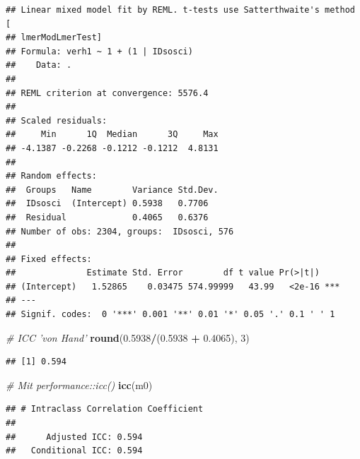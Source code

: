 \documentclass[
]{book}
\newenvironment{Shaded}{\begin{snugshade}}{\end{snugshade}}
\newcommand{\CommentTok}[1]{\textcolor[rgb]{0.56,0.35,0.01}{\textit{#1}}}
\newcommand{\DataTypeTok}[1]{\textcolor[rgb]{0.13,0.29,0.53}{#1}}
\newcommand{\DecValTok}[1]{\textcolor[rgb]{0.00,0.00,0.81}{#1}}
\newcommand{\FloatTok}[1]{\textcolor[rgb]{0.00,0.00,0.81}{#1}}
\newcommand{\KeywordTok}[1]{\textcolor[rgb]{0.13,0.29,0.53}{\textbf{#1}}}
\newcommand{\NormalTok}[1]{#1}
\newcommand{\OperatorTok}[1]{\textcolor[rgb]{0.81,0.36,0.00}{\textbf{#1}}}
\newcommand{\StringTok}[1]{\textcolor[rgb]{0.31,0.60,0.02}{#1}}
\begin{document}
\begin{Shaded}
\end{Shaded}

\begin{verbatim}
## Linear mixed model fit by REML. t-tests use Satterthwaite's method [
## lmerModLmerTest]
## Formula: verh1 ~ 1 + (1 | IDsosci)
##    Data: .
## 
## REML criterion at convergence: 5576.4
## 
## Scaled residuals: 
##     Min      1Q  Median      3Q     Max 
## -4.1387 -0.2268 -0.1212 -0.1212  4.8131 
## 
## Random effects:
##  Groups   Name        Variance Std.Dev.
##  IDsosci  (Intercept) 0.5938   0.7706  
##  Residual             0.4065   0.6376  
## Number of obs: 2304, groups:  IDsosci, 576
## 
## Fixed effects:
##              Estimate Std. Error        df t value Pr(>|t|)    
## (Intercept)   1.52865    0.03475 574.99999   43.99   <2e-16 ***
## ---
## Signif. codes:  0 '***' 0.001 '**' 0.01 '*' 0.05 '.' 0.1 ' ' 1
\end{verbatim}

\begin{Shaded}
\begin{Highlighting}[]
\CommentTok{# ICC 'von Hand'}
\KeywordTok{round}\NormalTok{(}\FloatTok{0.5938}\OperatorTok{/}\NormalTok{(}\FloatTok{0.5938} \OperatorTok{+}\StringTok{ }\FloatTok{0.4065}\NormalTok{), }\DecValTok{3}\NormalTok{)}
\end{Highlighting}
\end{Shaded}

\begin{verbatim}
## [1] 0.594
\end{verbatim}

\begin{Shaded}
\begin{Highlighting}[]
\CommentTok{# Mit performance::icc()}
\KeywordTok{icc}\NormalTok{(m0)}
\end{Highlighting}
\end{Shaded}

\begin{verbatim}
## # Intraclass Correlation Coefficient
## 
##      Adjusted ICC: 0.594
##   Conditional ICC: 0.594
\end{verbatim}
\end{document}
